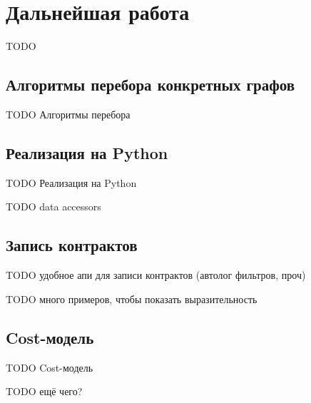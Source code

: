 \section{Дальнейшая работа}


TODO

\subsection{Алгоритмы перебора конкретных графов}

TODO Алгоритмы перебора

\subsection{Реализация на Python}

TODO Реализация на Python

TODO data accessors

\subsection{Запись контрактов}

TODO удобное апи для записи контрактов (автолог фильтров, проч)

TODO много примеров, чтобы показать выразительность

\subsection{Cost-модель}

TODO Cost-модель

TODO ещё чего?
